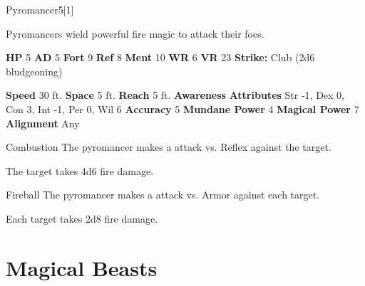   \begin{monsection}{Pyromancer}{5}[1]
    \vspace{-1em}\vspace{-1em}
    \vspace{0em}

    
      Pyromancers wield powerful fire magic to attack their foes.
    
    

    \begin{spellcontent}
      \begin{spelltargetinginfo}
        \pari \textbf{HP} 5 \monsep
          \textbf{AD} 5 \monsep
          \textbf{Fort} 9 \monsep
          \textbf{Ref} 8 \monsep
          \textbf{Ment} 10
        \pari \textbf{WR} 6 \monsep
        \textbf{VR} 23
        \pari \textbf{Strike:}
            Club  (2d6 bludgeoning)
      \end{spelltargetinginfo}
    \end{spellcontent}
    \begin{monsterfooter}
      \pari \textbf{Speed} 30 ft. \monsep
        \textbf{Space} 5 ft. \monsep
        \textbf{Reach} 5 ft.
      \pari \textbf{Awareness} 
      \pari \textbf{Attributes}
        Str -1, Dex 0,
        Con 3, Int -1,
        Per 0, Wil 6
      \pari \textbf{Accuracy} 5 \monsep
        \textbf{Mundane Power} 4 \monsep
      \textbf{Magical Power} 7
      \pari \textbf{Alignment} Any
    \end{monsterfooter}
  \end{monsection}
  \begin{freeability}{Combustion}
       The pyromancer makes a  attack
        vs. Reflex against the target.
    
    \hit The target takes 4d6 fire damage.
    \end{freeability}
  

    \begin{freeability}{Fireball}
       The pyromancer makes a  attack
        vs. Armor against each target.
    
    \hit Each target takes 2d8 fire damage.
    \end{freeability}
  
        \section{Magical Beasts}

